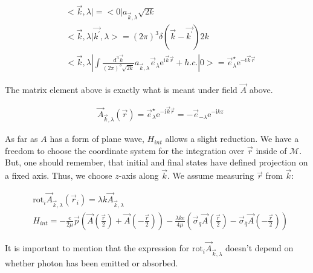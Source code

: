 \begin{align}
    &<\vec{k}, \lambda| = <0| a_{\vec{k}, \lambda} \sqrt{2 k}\\
    & <\vec{k}, \lambda|\vec{k^\prime}, \lambda> = {(2 \pi)}^3
        \delta(\vec{k} - \vec{k^\prime}) 2 k \\
    & <\vec{k}, \lambda| \int \frac{\mathrm{d}^3 \vec{k}}{{(2 \pi)}^3 \sqrt{2 k}} 
        a_{\vec{k}, \lambda} \vec{e}_{\lambda} \mathrm{e}^{\mathrm{i} \vec{k} \vec{r}}
        + h.c. |0> = \vec{e}^{\star}_{\lambda}
        \mathrm{e}^{-\mathrm{i} \vec{k} \vec{r}}
\end{align}

The matrix element above is exactly what is meant under field $\vec{A}$ above.

\begin{align}
    & \vec{A}_{\vec{k}, \lambda}(\vec{r}) =
        \vec{e}^{\star}_{\lambda}
        \mathrm{e}^{-\mathrm{i} \vec{k} \vec{r}} = 
        -\vec{e}_{-\lambda} \mathrm{e}^{-\mathrm{i} k z}
\end{align}

As far as $A$ has a form of plane wave, $H_{int}$ allows a slight reduction. We have a freedom to choose the coordinate system for the integration over $\vec{r}$ inside of $\mathcal{M}$. But, one should remember, that initial and final states have defined projection on a fixed axis. Thus, we choose $z$-axis along $\vec{k}$. We assume measuring $\vec{r}$ from $\vec{k}$:

\begin{align}
    &\mathrm{rot}_i \vec{A}_{\vec{k}, \lambda}(\vec{r}_i) = \lambda k \vec{A}_{\vec{k}, \lambda}  \\
    &H_{int} = -\frac{e}{2 \mu} \vec{p} \left( \vec{A}(\frac{\vec{r}}{2}) + \vec{A}(-\frac{\vec{r}}{2}) \right) - \frac{\lambda k e}{4 \mu} \left( \vec{\sigma}_{q} \vec{A}(\frac{\vec{r}}{2}) - \vec{\sigma}_{\overline{q}} \vec{A}(-\frac{\vec{r}}{2}) \right)
\end{align}

It is important to mention that the expression for $\mathrm{rot}_i \vec{A}_{\vec{k}, \lambda}$ doesn't depend on whether photon has been emitted or absorbed.

